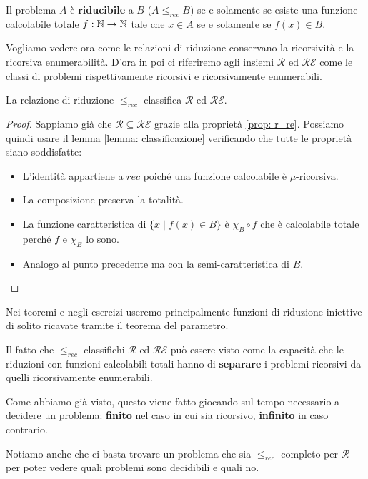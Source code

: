 \begin{definition}
	Il problema $A$ è \textbf{riducibile} a $B$ ($A \leq_{rec} B$)
	se e solamente se esiste una funzione calcolabile totale
	$f : \mathbb{N} \to \mathbb{N}$ tale che $x \in A$ se e solamente se
	$f(x) \in B$.
\end{definition}

Vogliamo vedere ora come le relazioni di riduzione conservano la
ricorsività e la ricorsiva enumerabilità. D'ora in poi ci
riferiremo agli insiemi $\mathcal{R}$ ed $\mathcal{RE}$ come le
classi di problemi rispettivamente ricorsivi e ricorsivamente
enumerabili.

\begin{theorem}
	La relazione di riduzione $\leq_{rec}$ classifica
	$\mathcal{R}$ ed $\mathcal{RE}$.
	\begin{proof}
		Sappiamo già che $\mathcal{R} \subseteq \mathcal{RE}$
		grazie alla proprietà \ref{prop: r_re}. Possiamo quindi
		usare il lemma \ref{lemma: classificazione} verificando
		che tutte le proprietà siano soddisfatte:
		\begin{itemize}
			\item L'identità appartiene a $rec$ poiché una
			      funzione calcolabile è $\mu$-ricorsiva.
			\item La composizione preserva la totalità.
			\item La funzione caratteristica di
			      $\{ x \mid f(x) \in B \}$ è $\chi_B \circ f$
			      che è calcolabile totale perché $f$ e $\chi_B$
			      lo sono.
			\item Analogo al punto precedente ma con la
			      semi-caratteristica di $B$.
		\end{itemize}
	\end{proof}
\end{theorem}

Nei teoremi e negli esercizi useremo principalmente funzioni
di riduzione iniettive di solito ricavate tramite il teorema
del parametro.

Il fatto che $\leq_{rec}$ classifichi $\mathcal{R}$ ed
$\mathcal{RE}$ può essere visto come la capacità che le
riduzioni con funzioni calcolabili totali hanno di
\textbf{separare} i problemi ricorsivi da quelli ricorsivamente
enumerabili.

Come abbiamo già visto, questo viene fatto giocando sul tempo
necessario a decidere un problema: \textbf{finito} nel caso
in cui sia ricorsivo, \textbf{infinito} in caso contrario.

Notiamo anche che ci basta trovare un problema che sia
$\leq_{rec}$-completo per $\mathcal{R}$ per poter vedere quali
problemi sono decidibili e quali no.

